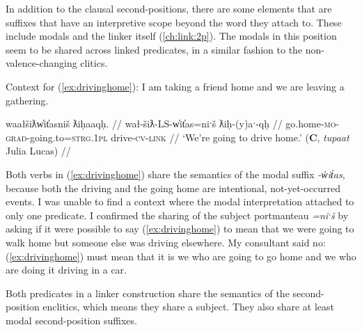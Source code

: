 In addition to the clausal second-positions, there are some elements that are suffixes that have an interpretive scope beyond the word they attach to. These include modals and the linker itself (\ref{ch:link:2p}). The modals in this position seem to be shared across linked predicates, in a similar fashion to the non-valence-changing clitics.

\vspace{5pt}

\noindent Context for (\ref{ex:drivinghome}): I am taking a friend home and we are leaving a gathering.

\ex \label{ex:drivinghome}
\begingl
\glpreamble waałšiƛw̓it̓asniš ƛiḥaaqḥ. //
\gla wał-šiƛ-LS-w̓it̓as=niˑš ƛiḥ-(y)aˑ-qḥ //
\glb go.home-\textsc{mo}-\textsc{grad}-going.to=\textsc{strg.1pl} drive-\textsc{cv}-\textsc{link} //
\glft `We're going to drive home.' (\textbf{C}, \textit{tupaat} Julia Lucas) //
\endgl
\xe

Both verbs in (\ref{ex:drivinghome}) share the semantics of the modal suffix \textit{-w̓it̓as}, because both the driving and the going home are intentional, not-yet-occurred events. I was unable to find a context where the modal interpretation attached to only one predicate. I confirmed the sharing of the subject portmanteau \textit{=niˑš} by asking if it were possible to say (\ref{ex:drivinghome}) to mean that we were going to walk home but someone else was driving elsewhere. My consultant said no: (\ref{ex:drivinghome}) must mean that it is we who are going to go home and we who are doing it driving in a car.

Both predicates in a linker construction share the semantics of the second-position enclitics, which means they share a subject. They also share at least modal second-position suffixes.


\begin{comment}
\ex \label{ex:someonespoke}
\begingl
\glpreamble ʔuušqḥʔaƛ ciqšiƛ.//
\gla ʔuuš-qḥ=ʔaƛ ciq-šiƛ //
\glb some-\textsc{link}=\textsc{now} speak-\textsc{mo} //
\glft `Someone spoke.' //
\endgl
\xe

\ex~ \label{ex:*someonespoke}
\begingl
\glpreamble *ʔuušqḥʔaƛ ciqšiƛḥ.//
\gla *ʔuuš-(q)ḥ=ʔaƛ ciq-šiƛ-(q)ḥ //
\glb *some-\textsc{link}=\textsc{now} speak-\textsc{mo}-\textsc{link} //
\glft Intended: `Someone spoke.' //
\endgl
\xe
\end{comment}

